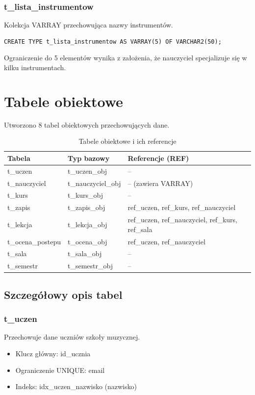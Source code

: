 \documentclass[12pt,a4paper]{article}
\begin{document}
\subsubsection{t\_lista\_instrumentow}
Kolekcja VARRAY przechowująca nazwy instrumentów.

\begin{verbatim}
CREATE TYPE t_lista_instrumentow AS VARRAY(5) OF VARCHAR2(50);
\end{verbatim}

Ograniczenie do 5 elementów wynika z założenia, że nauczyciel specjalizuje się w kilku instrumentach.

\section{Tabele obiektowe}

Utworzono 8 tabel obiektowych przechowujących dane.

\begin{table}[h]
\centering
\begin{tabular}{|l|l|l|}
\hline
\textbf{Tabela} & \textbf{Typ bazowy} & \textbf{Referencje (REF)} \\
\hline
t\_uczen & t\_uczen\_obj & -- \\
t\_nauczyciel & t\_nauczyciel\_obj & -- (zawiera VARRAY) \\
t\_kurs & t\_kurs\_obj & -- \\
t\_zapis & t\_zapis\_obj & ref\_uczen, ref\_kurs, ref\_nauczyciel \\
t\_lekcja & t\_lekcja\_obj & ref\_uczen, ref\_nauczyciel, ref\_kurs, ref\_sala \\
t\_ocena\_postepu & t\_ocena\_obj & ref\_uczen, ref\_nauczyciel \\
t\_sala & t\_sala\_obj & -- \\
t\_semestr & t\_semestr\_obj & -- \\
\hline
\end{tabular}
\caption{Tabele obiektowe i ich referencje}
\end{table}

\subsection{Szczegółowy opis tabel}

\subsubsection{t\_uczen}
Przechowuje dane uczniów szkoły muzycznej.
\begin{itemize}[nosep]
    \item Klucz główny: id\_ucznia
    \item Ograniczenie UNIQUE: email
    \item Indeks: idx\_uczen\_nazwisko (nazwisko)
\end{itemize}
\end{document}
